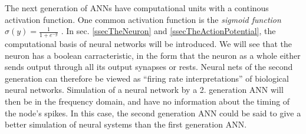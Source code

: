 The next generation of ANNs have computational units with a continous activation function. 
One common activation function is the \emph{sigmoid function} $\sigma(y)=\frac{1}{1+e^{-y}}$ \cite{HaykinANNbok}.
In sec. \ref{ssecTheNeuron} and \ref{ssecTheActionPotential}, the computational basis of neural networks will be introduced. %
We will see that the neuron has a boolean carracteristic, in the form that the neuron as a whole either sends output through all its output synapses or rests. %
%
Neural nets of the second generation can therefore be viewed as ``firing rate interpretations'' of biological neural networks\cite{Maass97networksof}.
Simulation of a neural network by a 2. generation ANN will then be in the frequency domain, and have no information about the timing of the node's spikes. %
In this case, the second generation ANN could be said to give a better simulation of neural systems than the first generation ANN. %


